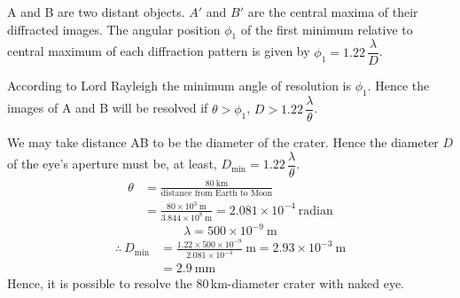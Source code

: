
A and B are two distant objects. $A'$ and $B'$ are the central maxima of
their diffracted images. The angular position $\phi_1$ of the first minimum
relative to central maximum of each diffraction pattern is given by
$\phi_1 = 1.22\,\dfrac{\lambda}{D}$.

According to Lord Rayleigh the minimum angle of resolution is $\phi_1$.
Hence the images of A and B will be resolved if $\theta > \phi_1$,
$D > 1.22\,\dfrac{\lambda}{\theta}$.

We may take distance AB to be the diameter of the crater. Hence the
diameter $D$ of the eye's aperture must be, at least,
$D_{\min} = 1.22\,\dfrac{\lambda}{\theta}$.
\begin{align*}
\theta &= \frac{80\ \mathrm{km}}{\text{distance from Earth to Moon}}\\
&= \frac{80 \times 10^{3}\ \mathrm{m}}{3.844 \times 10^{8}\ \mathrm{m}}
 = 2.081 \times 10^{-4}\ \text{radian}
\end{align*}
\[ \lambda = 500 \times 10^{-9}\ \mathrm{m} \]
\begin{align*}
\therefore\ D_{\min}
&= \frac{1.22 \times 500 \times 10^{-9}}{2.081 \times 10^{-4}}\ \mathrm{m}
 = 2.93 \times 10^{-3}\ \mathrm{m}\\
&= 2.9\ \mathrm{mm}
\end{align*}
Hence, it is possible to resolve the 80\,km-diameter crater with naked eye.
